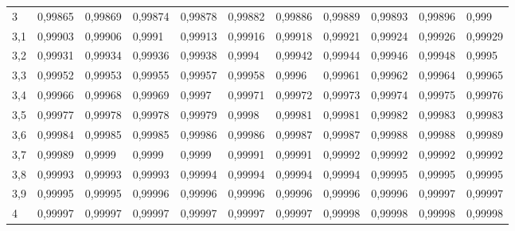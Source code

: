 \documentclass[addpoints,spanish, 12pt,a4paper]{exam}
\begin{document}
\begin{table}
\begin{tabular}{l|llllllllll}
3   & 0,99865 & 0,99869 & 0,99874 & 0,99878 & 0,99882 & 0,99886 & 0,99889 & 0,99893 & 0,99896 & 0,999   \\
3,1 & 0,99903 & 0,99906 & 0,9991  & 0,99913 & 0,99916 & 0,99918 & 0,99921 & 0,99924 & 0,99926 & 0,99929 \\
3,2 & 0,99931 & 0,99934 & 0,99936 & 0,99938 & 0,9994  & 0,99942 & 0,99944 & 0,99946 & 0,99948 & 0,9995  \\
3,3 & 0,99952 & 0,99953 & 0,99955 & 0,99957 & 0,99958 & 0,9996  & 0,99961 & 0,99962 & 0,99964 & 0,99965 \\
3,4 & 0,99966 & 0,99968 & 0,99969 & 0,9997  & 0,99971 & 0,99972 & 0,99973 & 0,99974 & 0,99975 & 0,99976 \\
3,5 & 0,99977 & 0,99978 & 0,99978 & 0,99979 & 0,9998  & 0,99981 & 0,99981 & 0,99982 & 0,99983 & 0,99983 \\
3,6 & 0,99984 & 0,99985 & 0,99985 & 0,99986 & 0,99986 & 0,99987 & 0,99987 & 0,99988 & 0,99988 & 0,99989 \\
3,7 & 0,99989 & 0,9999  & 0,9999  & 0,9999  & 0,99991 & 0,99991 & 0,99992 & 0,99992 & 0,99992 & 0,99992 \\
3,8 & 0,99993 & 0,99993 & 0,99993 & 0,99994 & 0,99994 & 0,99994 & 0,99994 & 0,99995 & 0,99995 & 0,99995 \\
3,9 & 0,99995 & 0,99995 & 0,99996 & 0,99996 & 0,99996 & 0,99996 & 0,99996 & 0,99996 & 0,99997 & 0,99997 \\
4   & 0,99997 & 0,99997 & 0,99997 & 0,99997 & 0,99997 & 0,99997 & 0,99998 & 0,99998 & 0,99998 & 0,99998
\end{tabular}
\end{table}
\restoregeometry
    
\end{document}
